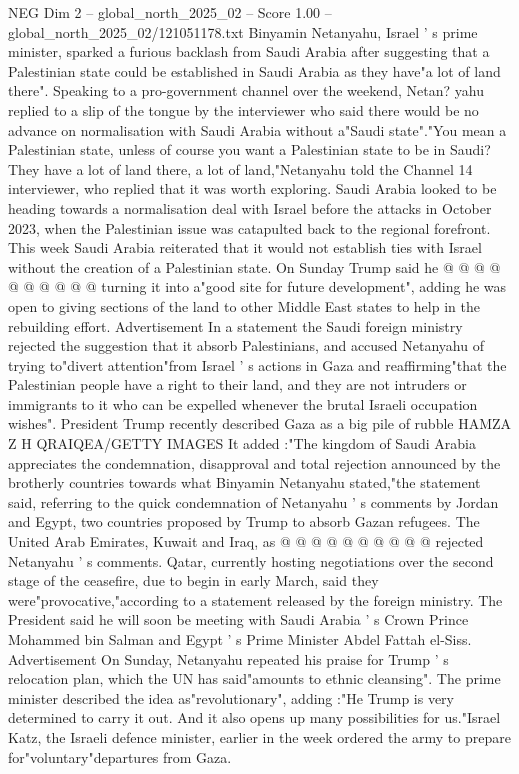 \begin{textsample}{NEG Dim 2 – global\_north\_2025\_02 – Score 1.00 – global\_north\_2025\_02/121051178.txt}  \label{ex:f2_neg_014}
Binyamin Netanyahu, Israel ' s prime minister, sparked a furious backlash from Saudi Arabia after suggesting that a Palestinian state could be established in Saudi Arabia as they have"a lot of land there".
Speaking to a pro-government channel over the weekend, Netan? yahu replied to a slip of the tongue by the interviewer who said there would be no advance on normalisation with Saudi Arabia without a"Saudi state"."You mean a Palestinian state, unless of course you want a Palestinian state to be in Saudi?
They have a lot of land there, a lot of land,"Netanyahu told the Channel 14 interviewer, who replied that it was worth exploring.
Saudi Arabia looked to be heading towards a normalisation deal with Israel before the attacks in October 2023, when the Palestinian issue was catapulted back to the regional forefront.
This week Saudi Arabia reiterated that it would not establish ties with Israel without the creation of a Palestinian state.
On Sunday Trump said he @ @ @ @ @ @ @ @ @ @ turning it into a"good site for future development", adding he was open to giving sections of the land to other Middle East states to help in the rebuilding effort.
Advertisement In a statement the Saudi foreign ministry rejected the suggestion that it absorb Palestinians, and accused Netanyahu of trying to"divert attention"from Israel ' s actions in Gaza and reaffirming"that the Palestinian people have a right to their land, and they are not intruders or immigrants to it who can be expelled whenever the brutal Israeli occupation wishes".
President Trump recently described Gaza as a big pile of rubble HAMZA Z H QRAIQEA/GETTY IMAGES It added :"The kingdom of Saudi Arabia appreciates the condemnation, disapproval and total rejection announced by the brotherly countries towards what Binyamin Netanyahu stated,"the statement said, referring to the quick condemnation of Netanyahu ' s comments by Jordan and Egypt, two countries proposed by Trump to absorb Gazan refugees.
The United Arab Emirates, Kuwait and Iraq, as @ @ @ @ @ @ @ @ @ @ rejected Netanyahu ' s comments.
Qatar, currently hosting negotiations over the second stage of the ceasefire, due to begin in early March, said they were"provocative,"according to a statement released by the foreign ministry.
The President said he will soon be meeting with Saudi Arabia ' s Crown Prince Mohammed bin Salman and Egypt ' s Prime Minister Abdel Fattah el-Siss.
Advertisement On Sunday, Netanyahu repeated his praise for Trump ' s relocation plan, which the UN has said"amounts to ethnic cleansing".
The prime minister described the idea as"revolutionary", adding :"He Trump is very determined to carry it out.
And it also opens up many possibilities for us."Israel Katz, the Israeli defence minister, earlier in the week ordered the army to prepare for"voluntary"departures from Gaza.

\end{textsample}
